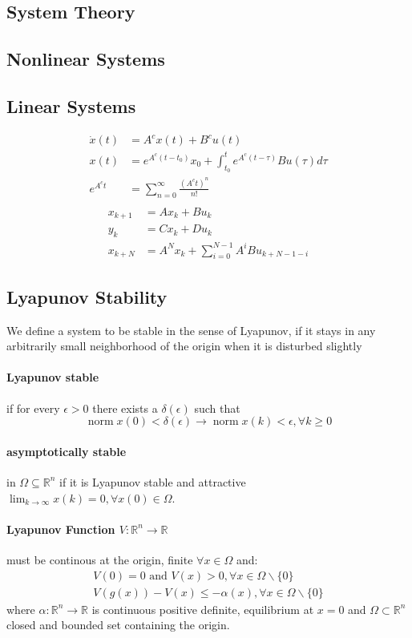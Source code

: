 \documentclass[landscape,a4paper,8pt]{scrartcl}
\newcommand{\R}{\mathbb R}
\DeclareMathOperator\norm{norm}
\begin{document}
\raggedright

\begin{multicols*}{3}
\section{System Theory}
\subsection{Nonlinear Systems}
\subsection{Linear Systems}
\begin{align*}
\dot{x}(t) &= A^cx(t)+B^cu(t)\\
x(t) &= e^{A^c(t-t_0)}x_0+\int_{t_0}^te^{A^c(t-\tau)}Bu(\tau)d\tau \\
e^{A^ct}&=\sum_{n=0}^\infty\frac{(A^ct)^n}{n!} \\
\end{align*}
\begin{align*}
x_{k+1} &= Ax_k+Bu_k\\
y_k &= Cx_k + Du_k\\
x_{k+N}&=A^Nx_k+\sum_{i=0}^{N-1}A^iBu_{k+N-1-i}
\end{align*}

\subsection{Lyapunov Stability}
We define a system to be stable in the sense of Lyapunov, if it stays in any arbitrarily small neighborhood of the origin when it is disturbed slightly
\paragraph{Lyapunov stable} if for every $\epsilon > 0$ there exists a $\delta(\epsilon)$ such that
\[ \norm{x(0)}<\delta(\epsilon)\to \norm{x(k)} < \epsilon, \forall k \geq 0 \]
\paragraph{asymptotically stable} in $\Omega\subseteq \R^n$ if it is Lyapunov stable and attractive $\lim_{k\to\infty}x(k)=0, \forall x(0)\in \Omega$.

\paragraph{Lyapunov Function $V: \R^n \to \R$}
must be continous at the origin, finite $\forall x \in \Omega$ and:
\begin{align*}
V(0) = 0 \text{ and } V(x)>0, \forall x\in \Omega \backslash \{0\}\\
V(g(x))-V(x) \leq -\alpha(x), \forall x\in\Omega\backslash \{0\}
\end{align*}
where $\alpha: \R^n\to\R$ is continuous positive definite, equilibrium at $x=0$
and $\Omega\subset\R^n$ closed and bounded set containing the origin.


\end{multicols*}
\end{document}
